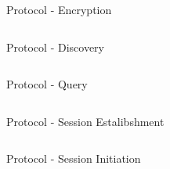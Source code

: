 \documentclass[a4paper]{beamer}
\begin{document}
\begin{frame}[fragile]{Protocol - Encryption}
    \begin{columns}[t]
        \begin{column}{0.44\textwidth}
            
        \end{column}
    \end{columns}
\end{frame}

\begin{frame}{Protocol - Discovery}
    \begin{columns}[t]
        \begin{column}{0.44\textwidth}
            
        \end{column}
        \begin{column}{0.44\textwidth}
            
        \end{column}
    \end{columns}
\end{frame}

\begin{frame}{Protocol - Query}
    \begin{columns}[t]
        \begin{column}{0.44\textwidth}
        \end{column}
        \begin{column}{0.44\textwidth}
            
        \end{column}
    \end{columns}
\end{frame}

\begin{frame}{Protocol - Session Estalibshment}
    \begin{columns}[t]
        \begin{column}{0.48\textwidth}
            
        \end{column}
        \begin{column}{0.40\textwidth}
            
        \end{column}
    \end{columns}
\end{frame}

\begin{frame}{Protocol - Session Initiation}
    \begin{columns}[t]
        \begin{column}{0.44\textwidth}
            
        \end{column}
        \begin{column}{0.44\textwidth}
        \end{column}
    \end{columns}
\end{frame}
\end{document}
